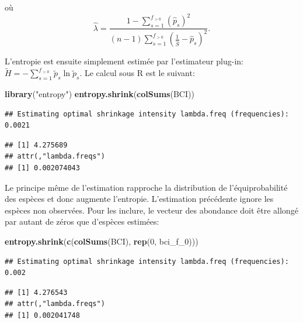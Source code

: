 \documentclass[
  11pt,
  american,
  a4paper,
  extrafontsizes,onecolumn,openright
  ]{memoir}
\newenvironment{Shaded}{\begin{snugshade}}{\end{snugshade}}
\newcommand{\DecValTok}[1]{\textcolor[rgb]{0.00,0.00,0.81}{#1}}
\newcommand{\FunctionTok}[1]{\textcolor[rgb]{0.13,0.29,0.53}{\textbf{#1}}}
\newcommand{\NormalTok}[1]{#1}
\newcommand{\StringTok}[1]{\textcolor[rgb]{0.31,0.60,0.02}{#1}}
\begin{document}
où
\begin{equation}
  \label{eq:JamesStein2}
  \hat{\lambda} = \frac
    {1 - \sum^{f_{>0}}_{s=1}{\left( \hat{p}_s \right)^2}}
    {\left( n - 1 \right) \sum^{f_{>0}}_{s=1}{\left( \frac{1}{\hat{S}} - \hat{p}_s \right)^2}}.
\end{equation}

L'entropie est ensuite simplement estimée par l'estimateur plug-in: \(\tilde{H} = -\sum^{f_{>0}}_{s=1}{\tilde{p}_s \ln{\tilde{p}_s}}\).
Le calcul sous R est le suivant:

\scriptsize

\begin{Shaded}
\begin{Highlighting}[]
\FunctionTok{library}\NormalTok{(}\StringTok{"entropy"}\NormalTok{)}
\FunctionTok{entropy.shrink}\NormalTok{(}\FunctionTok{colSums}\NormalTok{(BCI))}
\end{Highlighting}
\end{Shaded}

\begin{verbatim}
## Estimating optimal shrinkage intensity lambda.freq (frequencies): 0.0021
\end{verbatim}

\begin{verbatim}
## [1] 4.275689
## attr(,"lambda.freqs")
## [1] 0.002074043
\end{verbatim}

\normalsize

Le principe même de l'estimation rapproche la distribution de l'équiprobabilité des espèces et donc augmente l'entropie.
L'estimation précédente ignore les espèces non observées.
Pour les inclure, le vecteur des abondance doit être allongé par autant de zéros que d'espèces estimées:

\scriptsize

\begin{Shaded}
\begin{Highlighting}[]
\FunctionTok{entropy.shrink}\NormalTok{(}\FunctionTok{c}\NormalTok{(}\FunctionTok{colSums}\NormalTok{(BCI), }\FunctionTok{rep}\NormalTok{(}\DecValTok{0}\NormalTok{, bci\_f\_0)))}
\end{Highlighting}
\end{Shaded}

\begin{verbatim}
## Estimating optimal shrinkage intensity lambda.freq (frequencies): 0.002
\end{verbatim}

\begin{verbatim}
## [1] 4.276543
## attr(,"lambda.freqs")
## [1] 0.002041748
\end{verbatim}
\end{document}
